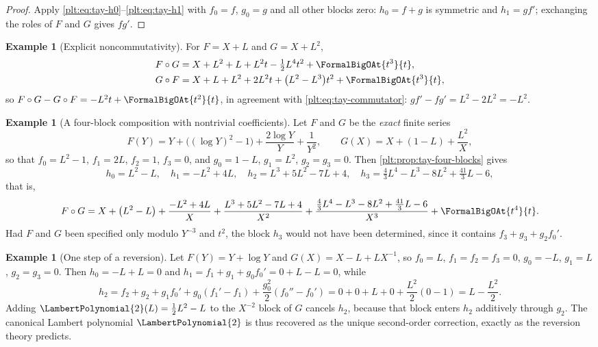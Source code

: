 \documentclass[11pt,oneside]{article}
\theoremstyle{plain}
\theoremstyle{definition}
\newtheorem{example}[theorem]{Example}
\theoremstyle{remark}
\newcommand{\compose}{\mathbin{\circ}}
\newcommand{\LamP}[1]{\LambertPolynomial{#1}}
\begin{document}
\begin{proof}
Apply \eqref{plt:eq:tay-h0}--\eqref{plt:eq:tay-h1} with
\(f_{0}=f\), \(g_{0}=g\) and all other blocks zero: \(h_{0}=f+g\) is
symmetric and \(h_{1}=gf'\); exchanging the roles of \(F\) and \(G\) gives
\(fg'\).
\end{proof}

\begin{example}[Explicit noncommutativity]\label{plt:ex:tay-noncommutative}
For \(F=X+L\) and \(G=X+L^{2}\),
\begin{align*}
 F\compose G&=X+L^{2}+L+L^{2}t-\tfrac12L^{4}t^{2}+\FormalBigOAt{t^{3}}{t},\\
 G\compose F&=X+L+L^{2}+2L^{2}t+\bigl(L^{2}-L^{3}\bigr)t^{2}
   +\FormalBigOAt{t^{3}}{t},
\end{align*}
so \(F\compose G-G\compose F=-L^{2}t+\FormalBigOAt{t^{2}}{t}\), in agreement
with \eqref{plt:eq:tay-commutator}: \(gf'-fg'=L^{2}-2L^{2}=-L^{2}\).
\end{example}

\begin{example}[A four-block composition with nontrivial coefficients]
\label{plt:ex:tay-four-block}
Let \(F\) and \(G\) be the \emph{exact} finite series
\[
 F(Y)=Y+\bigl((\log Y)^{2}-1\bigr)+\frac{2\log Y}{Y}+\frac{1}{Y^{2}},
 \qquad
 G(X)=X+(1-L)+\frac{L^{2}}{X},
\]
so that \(f_{0}=L^{2}-1\), \(f_{1}=2L\), \(f_{2}=1\), \(f_{3}=0\), and
\(g_{0}=1-L\), \(g_{1}=L^{2}\), \(g_{2}=g_{3}=0\).  Then
\cref{plt:prop:tay-four-blocks} gives
\[
 h_{0}=L^{2}-L,
 \quad
 h_{1}=-L^{2}+4L,
 \quad
 h_{2}=L^{3}+5L^{2}-7L+4,
 \quad
 h_{3}=\tfrac43L^{4}-L^{3}-8L^{2}+\tfrac{41}{3}L-6,
\]
that is,
\[
 F\compose G
 =X+\bigl(L^{2}-L\bigr)+\frac{-L^{2}+4L}{X}
  +\frac{L^{3}+5L^{2}-7L+4}{X^{2}}
  +\frac{\tfrac43L^{4}-L^{3}-8L^{2}+\tfrac{41}{3}L-6}{X^{3}}
  +\FormalBigOAt{t^{4}}{t}.
\]
Had \(F\) and \(G\) been specified only modulo \(Y^{-3}\) and \(t^{2}\), the
block \(h_{3}\) would not have been determined, since it contains
\(f_{3}+g_{3}+g_{2}f_{0}'\).
\end{example}

\begin{example}[One step of a reversion]\label{plt:ex:tay-lambert-step}
Let \(F(Y)=Y+\log Y\) and \(G(X)=X-L+LX^{-1}\), so \(f_{0}=L\),
\(f_{1}=f_{2}=f_{3}=0\), \(g_{0}=-L\), \(g_{1}=L\), \(g_{2}=g_{3}=0\).  Then
\(h_{0}=-L+L=0\) and \(h_{1}=f_1+g_{1}+g_{0}f_{0}'=0+L-L=0\), while
\[
 h_{2}=f_2+g_{2}+g_{1}f_{0}'+g_{0}(f_{1}'-f_{1})
   +\frac{g_{0}^{2}}{2}(f_{0}''-f_{0}')
 =0+0+L+0+\frac{L^{2}}{2}(0-1)
 =L-\frac{L^{2}}{2}.
\]
Adding \(\LamP{2}(L)=\tfrac12L^{2}-L\) to the \(X^{-2}\) block of \(G\)
cancels \(h_{2}\), because that block enters \(h_{2}\) additively through
\(g_{2}\).  The canonical Lambert polynomial \(\LamP{2}\) is thus recovered as
the unique second-order correction, exactly as the reversion theory predicts.
\end{example}
\end{document}
